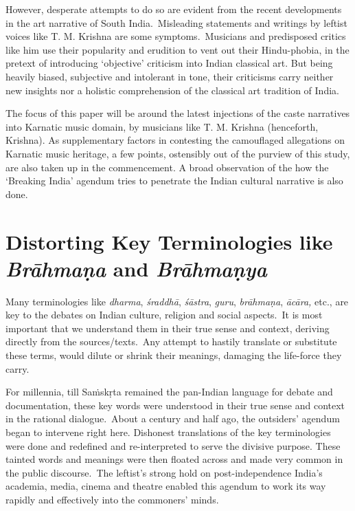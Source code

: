 However, desperate attempts to do so are evident from the recent developments in the art narrative of South India.~Misleading statements and writings by leftist voices like T. M. Krishna are some symptoms.~Musicians and predisposed critics like him use their popularity and erudition to vent out their Hindu-phobia, in the pretext of introducing ‘objective’ criticism into Indian classical art. But being heavily biased, subjective and intolerant in tone, their criticisms carry neither new insights nor a holistic comprehension of the classical art tradition of India.

The focus of this paper will be around the latest injections of the caste narratives into Karnatic music domain, by musicians like T. M. Krishna (henceforth, Krishna). As supplementary factors in contesting the camouflaged allegations on Karnatic music heritage, a few points, ostensibly out of the purview of this study, are also taken up in the commencement. A broad observation of the how the ‘Breaking India’ agendum tries to penetrate the Indian cultural narrative is also done.

\vspace{-.4cm}

\section*{Distorting Key Terminologies like \textit{Brāhmaṇa} and \textit{Brāhmaṇya}}

Many terminologies like \textit{dharma}, \textit{śraddhā}, \textit{śāstra}, \textit{guru}, \textit{brāhmaṇa}, \textit{ācāra,} etc., are key to the debates on Indian culture, religion and social aspects.~It is most important that we understand them in their true sense and context, deriving directly from the sources/texts.~Any attempt to hastily translate or substitute these terms, would dilute or shrink their meanings, damaging the life-force they carry.

For millennia, till Saṁskṛta remained the pan-Indian language for debate and documentation, these key words were understood in their true sense and context in the rational dialogue.~About a century and half ago, the outsiders’ agendum began to intervene right here. Dishonest translations of the key terminologies were done and redefined and re-interpreted to serve the divisive purpose. These tainted words and meanings were then floated across and made very common in the public discourse.~The leftist’s strong hold on post-independence India’s academia, media, cinema and theatre enabled this agendum to work its way rapidly and effectively into the commoners’ minds.

